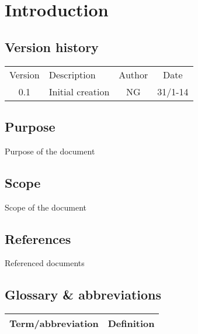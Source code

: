 \chapter{Introduction}
\section{Version history}
\begin{table}[H]
\begin{tabular}{|c|p{9cm}|c|c|}
\hline
Version & Description & Author & Date\\
0.1 & Initial creation & NG & 31/1-14 \\
\hline
\end{tabular}
\end{table}

\section{Purpose}
Purpose of the document

\section{Scope}
Scope of the document

\section{References}
Referenced documents

\section{Glossary \& abbreviations}
\begin{table}[H]
\centering
\begin{tabular}{|p{4cm}|p{7cm}|}
\hline
Term/abbreviation & Definition\\ \hline
\end{tabular}
\end{table}
